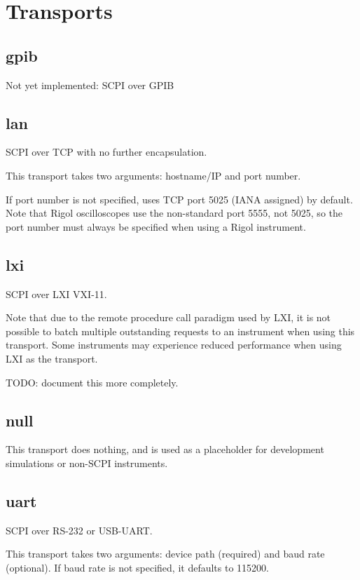 \chapter{Transports}
\label{sec:transports}

\section{gpib}

Not yet implemented: SCPI over GPIB

\section{lan}

SCPI over TCP with no further encapsulation.

This transport takes two arguments: hostname/IP and port number.

If port number is not specified, uses TCP port 5025 (IANA assigned) by default. Note that Rigol oscilloscopes use the
non-standard port 5555, not 5025, so the port number must always be specified when using a Rigol instrument.

\section{lxi}

SCPI over LXI VXI-11.

Note that due to the remote procedure call paradigm used by LXI, it is not possible to batch multiple outstanding
requests to an instrument when using this transport. Some instruments may experience reduced performance when using LXI
as the transport.

TODO: document this more completely.

\section{null}

This transport does nothing, and is used as a placeholder for development simulations or non-SCPI instruments.

\section{uart}

SCPI over RS-232 or USB-UART.

This transport takes two arguments: device path (required) and baud rate (optional). If baud rate is not specified, it
defaults to 115200.

